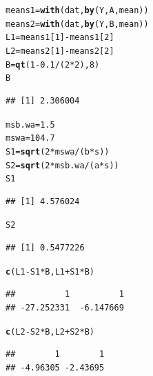 \documentclass{article}\usepackage[]{graphicx}\usepackage[]{color}
\makeatletter
\newcommand{\hlnum}[1]{\textcolor[rgb]{0.686,0.059,0.569}{#1}}%
\newcommand{\hlopt}[1]{\textcolor[rgb]{0,0,0}{#1}}%
\newcommand{\hlstd}[1]{\textcolor[rgb]{0.345,0.345,0.345}{#1}}%
\newcommand{\hlkwb}[1]{\textcolor[rgb]{0.69,0.353,0.396}{#1}}%
\newcommand{\hlkwd}[1]{\textcolor[rgb]{0.737,0.353,0.396}{\textbf{#1}}}%
\newenvironment{kframe}{%
 \def\at@end@of@kframe{}%
 \ifinner\ifhmode%
  \def\at@end@of@kframe{\end{minipage}}%
  \begin{minipage}{\columnwidth}%
 \fi\fi%
 \def\FrameCommand##1{\hskip\@totalleftmargin \hskip-\fboxsep
 \colorbox{shadecolor}{##1}\hskip-\fboxsep
     \hskip-\linewidth \hskip-\@totalleftmargin \hskip\columnwidth}%
 \MakeFramed {\advance\hsize-\width
   \@totalleftmargin\z@ \linewidth\hsize
   \@setminipage}}%
 {\par\unskip\endMakeFramed%
 \at@end@of@kframe}
\newenvironment{knitrout}{}{} %
\makeatother
\begin{document}
\begin{enumerate}[(a)]
\begin{knitrout}
\color{fgcolor}\begin{kframe}
\begin{alltt}
  \hlstd{means1} \hlkwb{=} \hlkwd{with}\hlstd{(dat,} \hlkwd{by}\hlstd{(Y, A , mean))}
  \hlstd{means2} \hlkwb{=} \hlkwd{with}\hlstd{(dat,} \hlkwd{by}\hlstd{(Y, B , mean))}
  \hlstd{L1} \hlkwb{=} \hlstd{means1[}\hlnum{1}\hlstd{]} \hlopt{-} \hlstd{means1[}\hlnum{2}\hlstd{]}
  \hlstd{L2} \hlkwb{=} \hlstd{means2[}\hlnum{1}\hlstd{]} \hlopt{-} \hlstd{means2[}\hlnum{2}\hlstd{]}
  \hlstd{B} \hlkwb{=} \hlkwd{qt}\hlstd{(}\hlnum{1}\hlopt{-}\hlnum{0.1}\hlopt{/}\hlstd{(}\hlnum{2}\hlopt{*}\hlnum{2}\hlstd{),} \hlnum{8}\hlstd{)}
  \hlstd{B}
\end{alltt}
\begin{verbatim}
## [1] 2.306004
\end{verbatim}
\begin{alltt}
  \hlstd{msb.wa} \hlkwb{=} \hlnum{1.5}
  \hlstd{mswa} \hlkwb{=} \hlnum{104.7}
  \hlstd{S1} \hlkwb{=} \hlkwd{sqrt}\hlstd{(}\hlnum{2}\hlopt{*}\hlstd{mswa}\hlopt{/}\hlstd{(b}\hlopt{*}\hlstd{s))}
  \hlstd{S2} \hlkwb{=} \hlkwd{sqrt}\hlstd{(}\hlnum{2}\hlopt{*}\hlstd{msb.wa}\hlopt{/}\hlstd{(a}\hlopt{*}\hlstd{s))}
  \hlstd{S1}
\end{alltt}
\begin{verbatim}
## [1] 4.576024
\end{verbatim}
\begin{alltt}
  \hlstd{S2}
\end{alltt}
\begin{verbatim}
## [1] 0.5477226
\end{verbatim}
\begin{alltt}
  \hlkwd{c}\hlstd{(L1}\hlopt{-}\hlstd{S1}\hlopt{*}\hlstd{B, L1}\hlopt{+}\hlstd{S1}\hlopt{*}\hlstd{B)}
\end{alltt}
\begin{verbatim}
##          1          1 
## -27.252331  -6.147669
\end{verbatim}
\begin{alltt}
  \hlkwd{c}\hlstd{(L2}\hlopt{-}\hlstd{S2}\hlopt{*}\hlstd{B, L2}\hlopt{+}\hlstd{S2}\hlopt{*}\hlstd{B)}
\end{alltt}
\begin{verbatim}
##        1        1 
## -4.96305 -2.43695
\end{verbatim}
\end{kframe}
\end{knitrout}


\end{enumerate}
\end{document}
